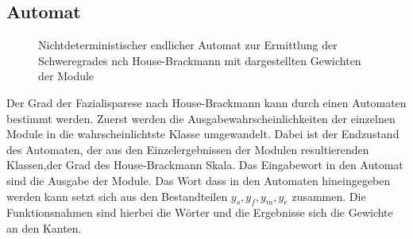 \subsection{Automat}\label{automata}
\begin{figure}[b]
\begin{center}
\caption[Nichtdeterministischer endlicher Automat zur Ermittlung der Schweregrades nach House-Brackmann mit dargestellten Gewichten der Module]{Nichtdeterministischer endlicher Automat zur Ermittlung der Schweregrades nch House-Brackmann mit dargestellten Gewichten der Module}\label{cap:automata}
\end{center}
\end{figure}\label{fig:automata}

Der Grad der Fazialisparese nach House-Brackmann kann durch einen Automaten bestimmt werden. Zuerst werden die Ausgabewahrscheinlichkeiten der einzelnen Module in die wahrscheinlichtste Klasse umgewandelt. Dabei ist der Endzustand des Automaten, der aus den Einzelergebnissen der Modulen resultierenden Klassen,der Grad des House-Brackmann Skala. Das Eingabewort in den Automat sind die Ausgabe der Module. Das Wort dass in den Automaten hineingegeben werden kann setzt sich aus den Bestandteilen $y_s, y_f, y_m, y_e$ zusammen. Die Funktionsnahmen sind hierbei die Wörter und die Ergebnisse sich die Gewichte an den Kanten.

